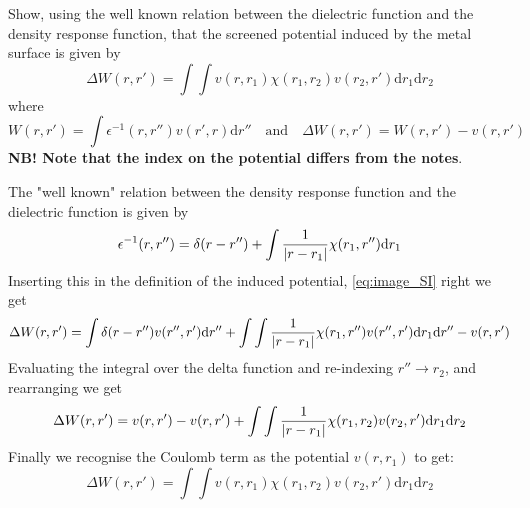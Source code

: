 \begin{exercise}
Show, using the well known relation between the dielectric function and the density response function, that the screened potential induced by the metal surface is given by
\begin{equation}
    \Delta W(r,r') = \int \int v(r,r_1)\chi(r_1,r_2)v(r_2,r')\mathrm{d}r_1\mathrm{d}r_2
\end{equation}
where 
\begin{equation}\label{eq:image_SI}
    W(r,r') = \int \epsilon^{-1}(r,r'')v(r',r)\mathrm{d}r'' \quad \mathrm{and} \quad \Delta W(r,r') = W(r,r') - v(r,r')
\end{equation}
\textbf{NB! Note that the index on the potential differs from the notes}.
\end{exercise}
\begin{solution}
The "well known" relation between the density response function and the dielectric function is given by
\begin{equation}
    \epsilon^{-1}(r,r'') = \delta(r-r'') + \int \dfrac{1}{\abs{r-r_1}}\chi(r_1,r'')\mathrm{d}r_1
\end{equation}
Inserting this in the definition of the induced potential, \eqref{eq:image_SI} right we get
\begin{equation}
    \Delta W(r,r') = \int\delta(r-r'')v(r'',r')\mathrm{d}r'' + \int\int \dfrac{1}{\abs{r-r_1}}\chi(r_1,r'')v(r'',r')\mathrm{d}r_1\mathrm{d}r'' - v(r,r')
\end{equation}
Evaluating the integral over the delta function and re-indexing $r'' \rightarrow r_2$, and rearranging we get 
\begin{equation}
    \Delta W(r,r') = v(r,r') - v(r,r') + \int \int \dfrac{1}{\abs{r-r_1}}\chi(r_1,r_2)v(r_2,r')\mathrm{d}r_1\mathrm{d}r_2
\end{equation}
Finally we recognise the Coulomb term as the potential $v(r,r_1)$ to get:
\begin{equation}
    \Delta W(r,r') =\int\int v(r,r_1)\chi(r_1,r_2)v(r_2,r')\mathrm{d}r_1\mathrm{d}r_2
\end{equation}
\end{solution}


